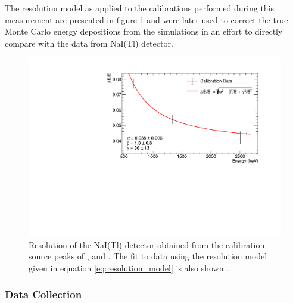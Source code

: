 The resolution model as applied to the calibrations performed during this measurement are presented in figure \ref{fig:detector_resolution_fit} and were later used to correct the true Monte Carlo energy depositions from the simulations in an effort to directly compare with the data from NaI(Tl) detector.
%
\begin{figure}[]
    \centering
    \includegraphics[scale=0.75]{Chapter_3/Figures/NaI_resolution.pdf}
    \caption[Resolution of the NaI(Tl) detector obtained from the calibration source peaks of \CoSZ{}, \CsOTS{} and \ThTTE{}.]
    {Resolution of the NaI(Tl) detector obtained from the calibration source peaks of \CoSZ{}, \CsOTS{} and \ThTTE{}. The fit to data using the resolution model given in equation \ref{eq:resolution_model} is also shown \cite{Akerib_2020_gray_measurements}.}
    \label{fig:detector_resolution_fit}
\end{figure}
%


\subsubsection{Data Collection}
\label{secsec:data_collection}

